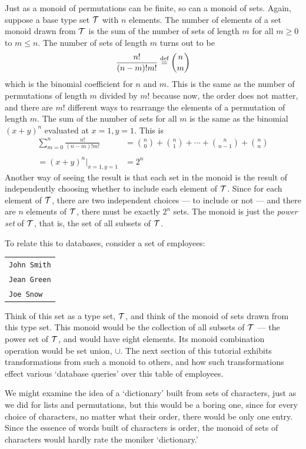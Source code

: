 Just as a monoid of permutations can be finite, so can a monoid of sets. Again, suppose a base type set $\mathcal{T}$ with $n$ elements. The number of elements of a set monoid drawn from $\mathcal{T}$ is the sum of the number of sets of length $m$ for all $m\geq 0$ to $m\leq n$. The number of sets of length $m$ turns out to be
\[
  \frac{n!}{(n-m)! m!}\overset{\text{def}}{=} \binom{n}{m}
\]
which is the binomial coefficient for $n$ and $m$. This is the same as the number of permutations of length $m$ divided by $m!$ because now, the order does not matter, and there are $m!$ different ways to rearrange the elements of a permutation of length $m$. The sum of the number of sets for all $m$ is the same as the binomial $(x+y)^n$ evaluated at $x=1, y=1$. This is
\begin{align*}
  \sum_{m=0}^{n}\frac{n!}{(n-m)! m!}
  &=\binom{n}{0}+\binom{n}{1}+\cdots+\binom{n}{n-1}+\binom{n}{n}\\
  {}&{}\\
  =(x+y)^n\vert_{x=1,y=1}&=2^n
\end{align*}
Another way of seeing the result is that each set in the monoid is the result of independently choosing whether to include each element of $\mathcal{T}$. Since for each element of $\mathcal{T}$, there are two independent choices --- to include or not --- and there are $n$ elements of $\mathcal{T}$, there must be exactly $2^n$ sets. The monoid is just the \emph{power set} of $\mathcal{T}$, that is, the set of all subsets of $\mathcal{T}$.


To relate this to databases, consider a set of employees:
\begin{center}
\begin{tabular}{l}
  \verb"John Smith"\\
  \verb"Jean Green"\\
  \verb"Joe Snow"
\end{tabular}
\end{center}
Think of this set as a type set, $\mathcal{T}$, and think of the monoid of sets drawn from this type set. This monoid would be the collection of all subsets of $\mathcal{T}$ --- the power set of $\mathcal{T}$, and would have eight elements. Its monoid combination operation would be set union, $\cup$. The next section of this tutorial exhibits transformations from such a monoid to others, and how such transformations effect various `database queries' over this table of employees.


We might examine the idea of a `dictionary' built from sets of characters, just as we did for lists and permutations, but this would be a boring one, since for every choice of characters, no matter what their order, there would be only one entry. Since the essence of words built of characters is order, the monoid of sets of characters would hardly rate the moniker `dictionary.'


